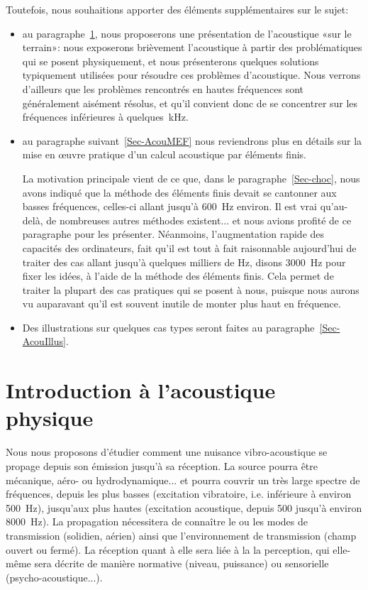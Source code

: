 Toutefois, nous souhaitions apporter des éléments supplémentaires sur le sujet: 
\begin{itemize}
   \item au paragraphe~\ref{Sec-AcouPhy}, nous proposerons une présentation de l'acoustique «sur le terrain»: nous exposerons brièvement l'acoustique à partir des problématiques qui se posent physiquement, et nous présenterons quelques solutions typiquement utilisées pour résoudre ces problèmes d'acoustique. Nous verrons d'ailleurs que les problèmes rencontrés en hautes fréquences sont généralement aisément résolus, et qu'il convient donc de se concentrer sur les fréquences inférieures à quelques~kHz.
   
   \item au paragraphe suivant~\ref{Sec-AcouMEF} nous reviendrons plus en détails sur la mise en œuvre pratique d'un calcul acoustique par éléments finis.
   
   La motivation principale vient de ce que, dans le paragraphe~\ref{Sec-choc}, nous avons indiqué que la méthode des éléments finis devait se cantonner aux basses fréquences, celles-ci allant jusqu'à 600~Hz environ. Il est vrai qu'au-delà, de nombreuses autres méthodes existent... et nous avions profité de ce paragraphe pour les présenter.
Néanmoins, l'augmentation rapide des capacités des ordinateurs, fait qu'il est tout à fait raisonnable aujourd'hui de traiter des cas allant jusqu'à quelques milliers de Hz, disons 3000~Hz pour fixer les idées, à l'aide de la méthode des éléments finis. Cela permet de traiter la plupart des cas pratiques qui se posent à nous, puisque nous aurons vu auparavant qu'il est souvent inutile de monter plus haut en fréquence.
   
   \item Des illustrations sur quelques cas types seront faites au paragraphe~\ref{Sec-AcouIllus}.
\end{itemize}

\medskip

\medskip
\section{Introduction à l'acoustique physique}\label{Sec-AcouPhy}

Nous nous proposons d'étudier comment une nuisance vibro-acoustique se propage depuis son émission jusqu'à sa réception.
La source pourra être mécanique, aéro- ou hydrodynamique... et pourra couvrir un très large spectre de fréquences, depuis les plus basses (excitation vibratoire, i.e. inférieure à environ 500~Hz), jusqu'aux plus hautes (excitation acoustique, depuis 500 jusqu'à environ 8000~Hz).
La propagation nécessitera de connaître le ou les modes de transmission (solidien, aérien) ainsi que l'environnement de transmission (champ ouvert ou fermé).
La réception quant à elle sera liée à la la perception, qui elle-même sera décrite de manière normative (niveau, puissance) ou sensorielle (psycho-acoustique...).

